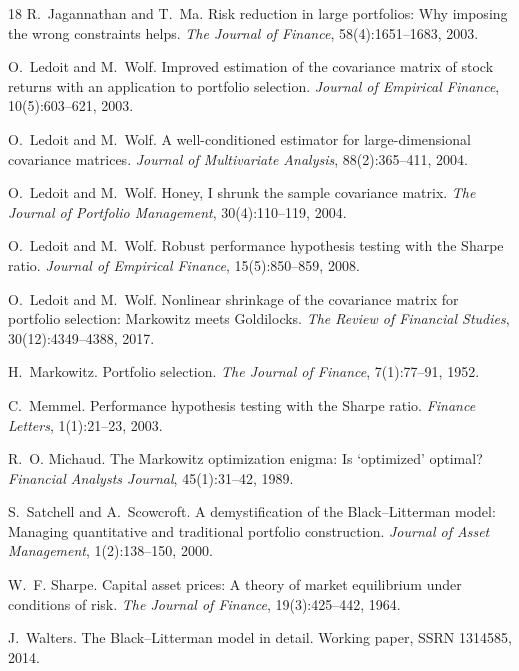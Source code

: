 \documentclass[a4paper,11pt]{article}
\theoremstyle{plain}
\theoremstyle{definition}
\begin{document}
\begin{thebibliography}{18}
R.~Jagannathan and T.~Ma.
\newblock Risk reduction in large portfolios: Why imposing the wrong
constraints helps.
\newblock \emph{The Journal of Finance}, 58(4):1651--1683, 2003.

O.~Ledoit and M.~Wolf.
\newblock Improved estimation of the covariance matrix of stock returns
with an application to portfolio selection.
\newblock \emph{Journal of Empirical Finance}, 10(5):603--621, 2003.

O.~Ledoit and M.~Wolf.
\newblock A well-conditioned estimator for large-dimensional covariance
matrices.
\newblock \emph{Journal of Multivariate Analysis}, 88(2):365--411,
2004{}.

O.~Ledoit and M.~Wolf.
\newblock Honey, I shrunk the sample covariance matrix.
\newblock \emph{The Journal of Portfolio Management}, 30(4):110--119,
2004{}.

O.~Ledoit and M.~Wolf.
\newblock Robust performance hypothesis testing with the Sharpe ratio.
\newblock \emph{Journal of Empirical Finance}, 15(5):850--859, 2008.

O.~Ledoit and M.~Wolf.
\newblock Nonlinear shrinkage of the covariance matrix for portfolio
selection: Markowitz meets Goldilocks.
\newblock \emph{The Review of Financial Studies}, 30(12):4349--4388, 2017.

H.~Markowitz.
\newblock Portfolio selection.
\newblock \emph{The Journal of Finance}, 7(1):77--91, 1952.

C.~Memmel.
\newblock Performance hypothesis testing with the Sharpe ratio.
\newblock \emph{Finance Letters}, 1(1):21--23, 2003.

R.~O. Michaud.
\newblock The Markowitz optimization enigma: Is `optimized' optimal?
\newblock \emph{Financial Analysts Journal}, 45(1):31--42, 1989.

S.~Satchell and A.~Scowcroft.
\newblock A demystification of the Black--Litterman model: Managing
quantitative and traditional portfolio construction.
\newblock \emph{Journal of Asset Management}, 1(2):138--150, 2000.

W.~F. Sharpe.
\newblock Capital asset prices: A theory of market equilibrium under
conditions of risk.
\newblock \emph{The Journal of Finance}, 19(3):425--442, 1964.

J.~Walters.
\newblock The Black--Litterman model in detail.
\newblock Working paper, SSRN 1314585, 2014.

\end{thebibliography}
\end{document}
